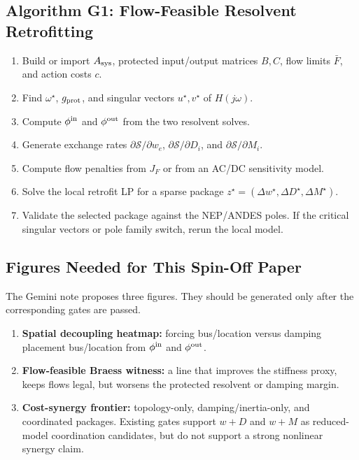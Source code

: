 \documentclass[11pt]{article}
\begin{document}
\subsection{Algorithm G1: Flow-Feasible Resolvent Retrofitting}

\begin{enumerate}
\item Build or import $A_{\rm sys}$, protected input/output matrices $B,C$, flow
limits $\bar F$, and action costs $c$.
\item Find $\omega^\star$, $g_{\rm prot}$, and singular vectors $u^\star,v^\star$
of $H(j\omega)$.
\item Compute $\phi^{\rm in}$ and $\phi^{\rm out}$ from the two resolvent solves.
\item Generate exchange rates
$\partial\mathcal S/\partial w_e$,
$\partial\mathcal S/\partial D_i$, and
$\partial\mathcal S/\partial M_i$.
\item Compute flow penalties from $J_F$ or from an AC/DC sensitivity model.
\item Solve the local retrofit LP for a sparse package
$z^\star=(\Delta w^\star,\Delta D^\star,\Delta M^\star)$.
\item Validate the selected package against the NEP/ANDES poles.  If the
critical singular vectors or pole family switch, rerun the local model.
\end{enumerate}

\subsection{Figures Needed for This Spin-Off Paper}

The Gemini note proposes three figures.  They should be generated only after the
corresponding gates are passed.
\begin{enumerate}
\item \textbf{Spatial decoupling heatmap:} forcing bus/location versus damping
placement bus/location from $\phi^{\rm in}$ and $\phi^{\rm out}$.
\item \textbf{Flow-feasible Braess witness:} a line that improves the stiffness
proxy, keeps flows legal, but worsens the protected resolvent or damping margin.
\item \textbf{Cost-synergy frontier:} topology-only, damping/inertia-only, and
coordinated packages.  Existing gates support $w+D$ and $w+M$ as reduced-model
coordination candidates, but do not support a strong nonlinear synergy claim.
\end{enumerate}
\end{document}
